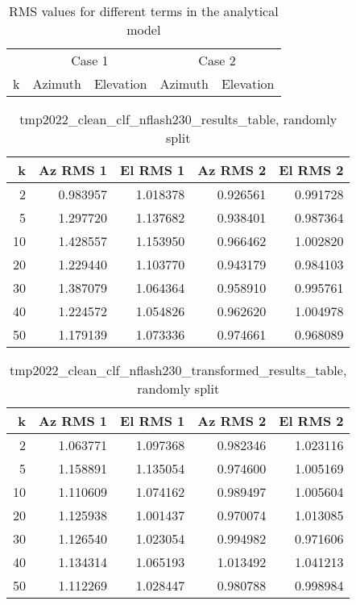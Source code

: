 
\begin{table}[h]
    \centering
    \caption{RMS values for different terms in the analytical model}
    \begin{tabular}{c|cccc}
    \multicolumn{1}{c}{} & \multicolumn{2}{c}{Case 1} & \multicolumn{2}{c}{Case 2} \\
    k & Azimuth & Elevation & Azimuth & Elevation \\
    \hline
    \end{tabular}
\end{table}

\begin{table}[h]
    \centering
    \caption{tmp2022_clean_clf_nflash230_results_table, randomly split}
    \begin{tabular}{rrrrr}
        \toprule
        k & Az RMS 1 & El RMS 1 & Az RMS 2 & El RMS 2 \\
        \midrule
         2 &  0.983957 & 1.018378 &  0.926561 &  0.991728 \\
         5 &  1.297720 & 1.137682 &  0.938401 &  0.987364 \\
        10 &  1.428557 & 1.153950 &  0.966462 &  1.002820 \\
        20 &  1.229440 & 1.103770 &  0.943179 &  0.984103 \\
        30 &  1.387079 & 1.064364 &  0.958910 &  0.995761 \\
        40 &  1.224572 & 1.054826 &  0.962620 &  1.004978 \\
        50 &  1.179139 & 1.073336 &  0.974661 &  0.968089 \\
        \bottomrule
    \end{tabular}
\end{table}


\begin{table}[h]
    \centering
    \caption{tmp2022_clean_clf_nflash230_transformed_results_table, randomly split}
    \begin{tabular}{rrrrr}
        \toprule
        k & Az RMS 1 & El RMS 1 & Az RMS 2 & El RMS 2 \\
        \midrule
         2 &  1.063771 & 1.097368 &  0.982346 &  1.023116 \\
         5 &  1.158891 & 1.135054 &  0.974600 &  1.005169 \\
        10 &  1.110609 & 1.074162 &  0.989497 &  1.005604 \\
        20 &  1.125938 & 1.001437 &  0.970074 &  1.013085 \\
        30 &  1.126540 & 1.023054 &  0.994982 &  0.971606 \\
        40 &  1.134314 & 1.065193 &  1.013492 &  1.041213 \\
        50 &  1.112269 & 1.028447 &  0.980788 &  0.998984 \\
        \bottomrule
    \end{tabular}
\end{table}


